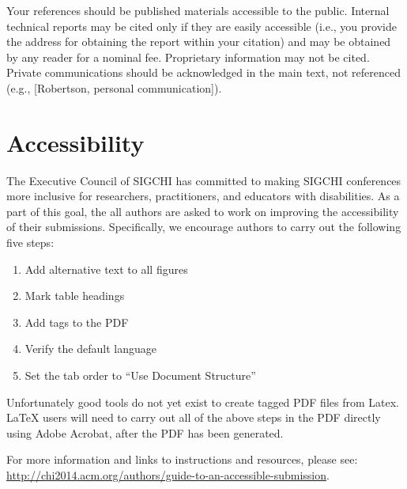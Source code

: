 \documentclass{chi-ext}
\begin{document}
Your references should be published materials accessible to the public.  
Internal technical reports may be cited only if they are easily accessible (i.e., you provide the address for obtaining the report within your citation) and may be obtained by any reader for a nominal fee.  
Proprietary information may not be cited. 
Private communications should be acknowledged in the main text, not referenced  (e.g., [Robertson, personal communication]).


\section{Accessibility}
The Executive Council of SIGCHI has committed to making SIGCHI conferences more inclusive for researchers, practitioners, and educators with disabilities. As a part of this goal, the all authors are asked to work on improving the accessibility of their submissions. Specifically, we encourage authors to carry out the following five steps:
\begin{enumerate}
	\item Add alternative text to all figures
	\item Mark table headings
	\item Add tags to the PDF
	\item Verify the default language
	\item Set the tab order to ``Use Document Structure''
\end{enumerate}
Unfortunately good tools do not yet exist to create tagged PDF files from Latex. LaTeX users will need to carry out all of the above steps in the PDF directly using Adobe Acrobat, after the PDF has been generated.
 
For more information and links to instructions and resources, please see:
{\url{http://chi2014.acm.org/authors/guide-to-an-accessible-submission}}.

\end{document}

